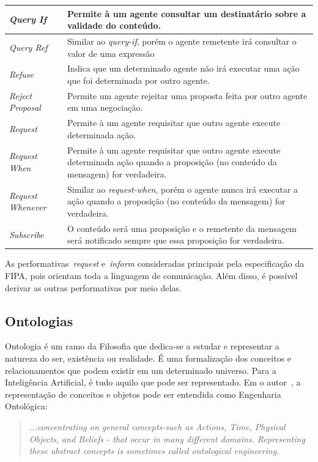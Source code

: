 \begin{table}
\begin{tabular}{|p{3cm} | p{12cm} |}
		\hline
		\emph{Query If} & Permite à um agente consultar um destinatário sobre a validade do conteúdo.	\\
		\hline
		\emph{Query Ref} & Similar ao \emph{query-if}, porém o agente remetente irá consultar o valor de uma expressão	\\
		\hline
		\emph{Refuse} & Indica que um determinado agente não irá executar uma ação que foi determinada por outro agente.	\\
		\hline
		\emph{Reject Proposal} & Permite um agente rejeitar uma proposta feita por outro agente em uma negociação.	\\
		\hline
		\emph{Request} & Permite à um agente requisitar que outro agente execute determinada ação.	\\
		\hline
		\emph{Request When} & Permite à um agente requisitar que outro agente execute determinada ação quando a proposição (no conteúdo da mensagem) for verdadeira.	\\
		\hline
		\emph{Request Whenever} & Similar ao \emph{request-when}, porém o agente nunca irá executar a ação quando a proposição (no conteúdo da mensagem) for verdadeira.	\\
		\hline
		\emph{Subscribe} & O conteúdo será uma proposição e o remetente da mensagem será notificado sempre que essa proposição for verdadeira.	\\
		\hline
	\end{tabular}
	\label{table:fipa-cal-spec}
\end{table}

As performativas~\emph{request} e~\emph{inform} consideradas principais pela especificação da FIPA, pois orientam toda a linguagem de comunicação. Além disso, é possível derivar as outras performativas por meio delas.


\subsection{Ontologias}

Ontologia é um ramo da Filosofia que dedica-se a estudar e representar a natureza do ser, existência ou realidade. É uma formalização dos conceitos e relacionamentos que podem existir em um determinado universo. Para a Inteligência Artificial, é tudo aquilo que pode ser representado. Em o autor~\cite{novig95}, a representação de conceitos e objetos pode ser entendida como Engenharia Ontológica:

\begin{quote}
\emph{...concentrating on general concepts-such as Actions, Time, Physical Objects, and Beliefs - that occur in many different domains. Representing these abstract concepts is sometimes called ontological engineering.}
\end{quote}

